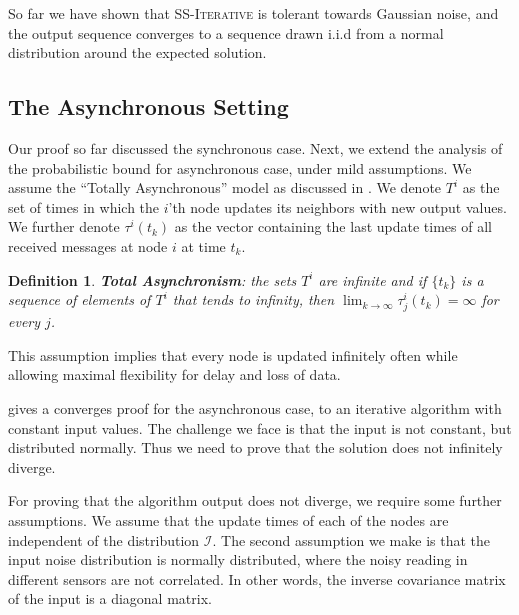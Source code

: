 \documentclass[preprint,12pt]{elsarticle}
\newtheorem{definition}{Definition}
\newcommand{\syncAlg}{\textsc{SS-Iterative}\xspace}
\begin{document}
So far we have shown that \syncAlg is tolerant towards Gaussian noise, and the output sequence converges to a sequence drawn i.i.d from a normal distribution around the expected solution. 

\subsection{The Asynchronous Setting}

Our proof so far discussed the synchronous case. Next, we extend the analysis of the probabilistic bound for asynchronous case, under mild assumptions. We assume the ``Totally Asynchronous'' model as discussed in \cite{BT97}. We denote $T^i$ as the set of times in which the $i$'th node updates its neighbors with new output values. We further denote $\tau^{i}(t_k)$ as the vector containing the last update times of all received messages at node $i$ at time $t_k$.
\begin{definition}
 {\bf Total Asynchronism}: the sets $T^i$ are infinite and if $\{t_k\}$ is a sequence of elements of $T^i$ that tends to infinity, then $\lim_{k\rightarrow\infty}\tau^{i}_j(t_k) = \infty$ for every $j$.
\end{definition}
This assumption implies that every node is updated infinitely often while allowing maximal flexibility for delay and loss of data.

\cite{BT97} gives a converges proof for the asynchronous case, to an iterative algorithm with constant input values.
The challenge we face is that the input is not constant, but distributed normally. Thus we need to prove that the solution does not infinitely diverge.

For proving that the algorithm output does not diverge, we require some further assumptions. We assume that the update times of each of the nodes are independent of the distribution $\mathcal{I}$. The second assumption we make is that the
input noise distribution is normally distributed, where the noisy reading in different sensors are not correlated.
In other words, the inverse covariance matrix of the input is a diagonal matrix.
\end{document}
